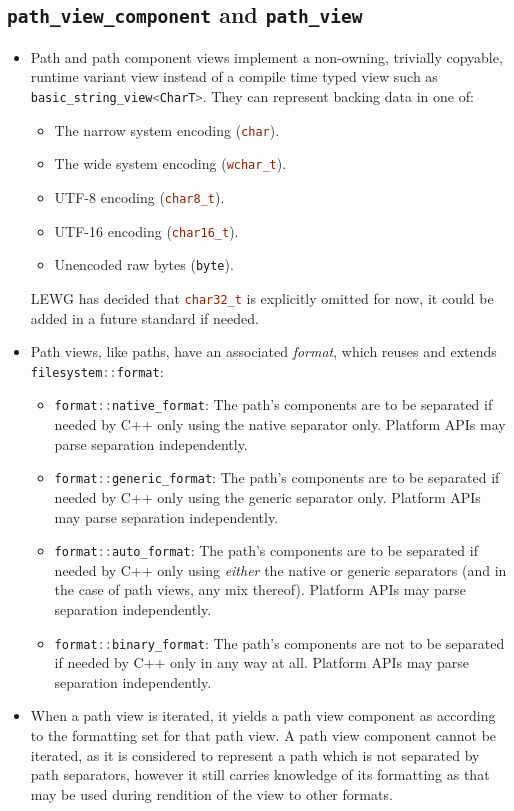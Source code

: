 \documentclass[11pt]{article}
\newcommand{\code}[2][cpp]{\lstinline[language=#1,basicstyle=\small\ttfamily]{#2}}
\begin{document}
\subsection{\code{path_view_component} and \code{path_view}}

\begin{itemize}
    \item Path and path component views implement a non-owning, trivially copyable, runtime variant view instead of a compile time typed view such as \code{basic_string_view<CharT>}. They can represent backing data in one of:
    \begin{itemize}
        \item The narrow system encoding (\code{char}).
        \item The wide system encoding (\code{wchar_t}).
        \item UTF-8 encoding (\code{char8_t}).
        \item UTF-16 encoding (\code{char16_t}).
        \item Unencoded raw bytes (\code{byte}).
    \end{itemize}
    LEWG has decided that \code{char32_t} is explicitly omitted for now, it could be added in a future standard if needed.
    \item Path views, like paths, have an associated \emph{format}, which reuses and extends \code{filesystem::format}:
    \begin{itemize}
        \item \code{format::native_format}: The path's components are to be separated if needed by C++ only using the native separator only. Platform APIs may parse separation independently.
        \item \code{format::generic_format}: The path's components are to be separated if needed by C++ only using the generic separator only. Platform APIs may parse separation independently.
        \item \code{format::auto_format}: The path's components are to be separated if needed by C++ only using \emph{either} the native or generic separators (and in the case of path views, any mix thereof). Platform APIs may parse separation independently.
        \item \code{format::binary_format}: The path's components are not to be separated if needed by C++ only in any way at all. Platform APIs may parse separation independently.
    \end{itemize}
    \item When a path view is iterated, it yields a path view component as according to the formatting set for that path view. A path view component cannot be iterated, as it is considered to represent a path which is not separated by path separators, however it still carries knowledge of its formatting as that may be used during rendition of the view to other formats.
    

\end{itemize}
\end{document}
